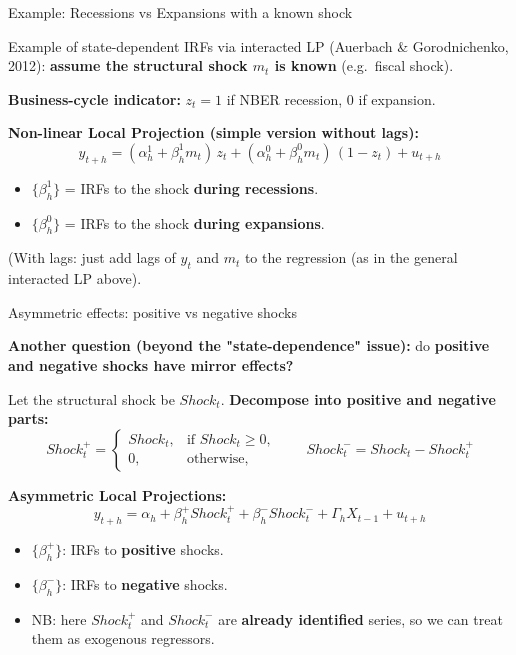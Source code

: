 \documentclass{beamer}
\begin{document}
\begin{frame}{Example: Recessions vs Expansions with a known shock}
\small

Example of state-dependent IRFs via interacted LP (Auerbach \& Gorodnichenko, 2012): \textbf{assume the structural shock $m_t$ is known} (e.g.\ fiscal shock).

\medskip
\textbf{Business-cycle indicator:} $z_t = 1$ if NBER recession, $0$ if expansion.

\medskip
\textbf{Non-linear Local Projection (simple version without lags):}
\[
y_{t+h}
 = (\alpha_h^1 + \beta_h^1 m_t)\, z_t 
 + (\alpha_h^0 + \beta_h^0 m_t)\,(1 - z_t)
 + u_{t+h}
\]

\begin{itemize}
\item $\{\beta_h^1\}$ = IRFs to the shock \textbf{during recessions}.
\item $\{\beta_h^0\}$ = IRFs to the shock \textbf{during expansions}.

\end{itemize}

\medskip
(With lags: just add lags of $y_t$ and $m_t$ to the regression
(as in the general interacted LP above).

\end{frame}


\begin{frame}{Asymmetric effects: positive vs negative shocks}
\small

\textbf{Another question (beyond the "state-dependence" issue):} do \textbf{positive and negative shocks have \textbf{mirror} effects?}

\medskip
Let the structural shock be $Shock_t$. \textbf{Decompose into positive and negative parts:}
\[
Shock_t^+ =
\begin{cases}
Shock_t, & \text{if } Shock_t \ge 0,\\
0,       & \text{otherwise},
\end{cases}
\qquad
Shock_t^- = Shock_t - Shock_t^+
\]

\medskip
\textbf{Asymmetric Local Projections:}
\[
y_{t+h}
 = \alpha_h
 + \beta_h^+ Shock_t^+
 + \beta_h^- Shock_t^-
 + \Gamma_h X_{t-1}
 + u_{t+h}
\]

\begin{itemize}
  \item $\{\beta_h^+\}$: IRFs to \textbf{positive} shocks.
  \item $\{\beta_h^-\}$: IRFs to \textbf{negative} shocks.
\end{itemize}

\begin{itemize}
  \item NB: here $Shock_t^+$ and $Shock_t^-$ are \textbf{already identified} series,
        so we can treat them as exogenous regressors.
\end{itemize}

\end{frame}
\end{document}
